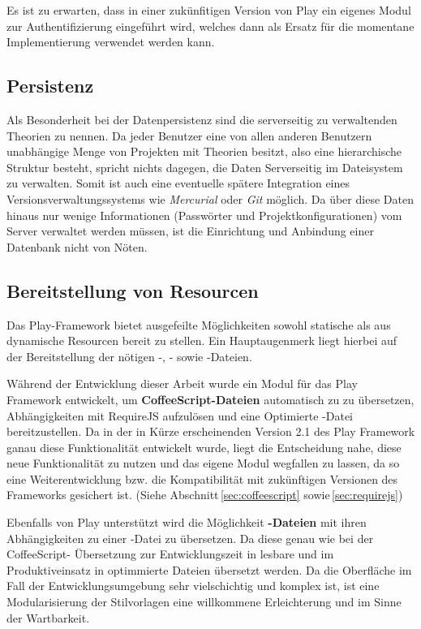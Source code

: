 Es ist zu erwarten, dass in einer zukünfitigen Version von Play ein eigenes Modul zur
Authentifizierung eingeführt wird, welches dann als Ersatz für die momentane Implementierung
verwendet werden kann.

\subsection{Persistenz}

Als Besonderheit bei der Datenpersistenz sind die serverseitig zu verwaltenden Theorien zu nennen.
Da jeder Benutzer eine von allen anderen Benutzern unabhängige Menge von Projekten mit Theorien
besitzt, also eine hierarchische Struktur besteht, spricht nichts dagegen, die Daten Serverseitig im
Dateisystem zu verwalten. Somit ist auch eine eventuelle spätere Integration eines
Versionsverwaltungssystems wie \textit{Mercurial} oder \textit{Git} möglich. Da über diese Daten
hinaus nur wenige Informationen (Passwörter und Projektkonfigurationen) vom Server verwaltet werden
müssen, ist die Einrichtung und Anbindung einer Datenbank nicht von Nöten.

\subsection{Bereitstellung von Resourcen}

Das Play-Framework bietet ausgefeilte Möglichkeiten sowohl statische als aus dynamische Resourcen
bereit zu stellen. Ein Hauptaugenmerk liegt hierbei auf der Bereitstellung der nötigen -,
- sowie -Dateien.

Während der Entwicklung dieser Arbeit wurde ein Modul für das Play Framework entwickelt, um \textbf
{CoffeeScript-Dateien} automatisch zu  zu übersetzen, Abhängigkeiten mit RequireJS
aufzulösen und eine Optimierte -Datei bereitzustellen. Da in der in Kürze erscheinenden
Version 2.1 des Play Framework ganau diese Funktionalität entwickelt wurde, liegt die Entscheidung
nahe, diese neue Funktionalität zu nutzen und das eigene Modul wegfallen zu lassen, da so eine
Weiterentwicklung bzw. die Kompatibilität mit zukünftigen Versionen des Frameworks gesichert ist.
(Siehe Abschnitt\,\ref{sec:coffeescript} sowie\,\ref{sec:requirejs})

Ebenfalls von Play unterstützt wird die Möglichkeit  \textbf{-Dateien} mit ihren
Abhängigkeiten zu einer -Datei zu übersetzen. Da diese genau wie bei der CoffeeScript-
Übersetzung zur Entwicklungszeit in lesbare und im Produktiveinsatz in optimmierte Dateien übersetzt
werden. Da die Oberfläche im Fall der Entwicklungsumgebung sehr vielschichtig und komplex ist, ist
eine Modularisierung der Stilvorlagen eine willkommene Erleichterung und im Sinne der Wartbarkeit.

